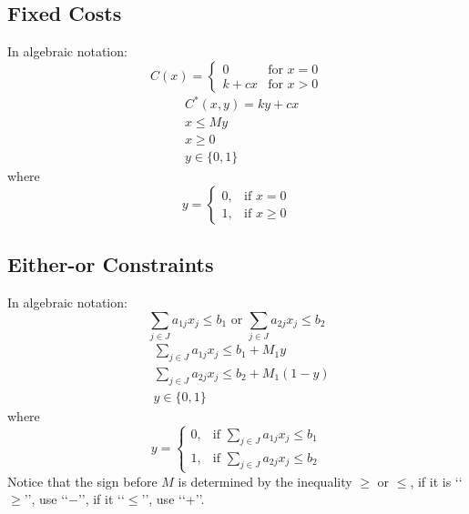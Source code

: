 \documentclass[10pt]{book}
\begin{document}
				\subsection{Fixed Costs}
					 In algebraic notation: 
					\begin{equation}
						C(x) = \begin{cases} 0 & \text{for } x=0 \\ k + cx & \text{for } x > 0 \end{cases} \nonumber
					\end{equation}
					\begin{align}
						& C^*(x, y) = ky+cx\nonumber\\
						& x \le My \nonumber \\
						& x \ge 0 \nonumber\\
						& y \in \{0, 1\} \nonumber
					\end{align}
					where
					\begin{equation}y=\begin{cases}0, & \text{if }x=0 \\ 1, & \text{if }x\ge 0\end{cases}\nonumber \end{equation}
				
				\subsection{Either-or Constraints}
					 In algebraic notation: 
					\begin{equation}
						\sum_{j\in J} a_{1j} x_j \le b_1 \text{ or } \sum_{j\in J} a_{2j} x_j \le b_2 \nonumber
					\end{equation}
					\begin{align}
						& \sum_{j\in J} a_{1j} x_j \le b_1 + M_1y \nonumber \\
						& \sum_{j\in J} a_{2j} x_j \le b_2 + M_1(1-y) \nonumber \\
						& y \in \{0, 1\} \nonumber
					\end{align}
					where
					\begin{equation}y=\begin{cases}0, & \text{if }\sum_{j\in J} a_{1j} x_j \le b_1 \\ 1, & \text{if } \sum_{j\in J} a_{2j} x_j \le b_2\end{cases}\nonumber \end{equation}
					Notice that the sign before $M$ is determined by the inequality $\ge$ or $\le$, if it is \lq\lq{}$\ge$\rq\rq{}, use \lq\lq{}$-$\rq\rq{}, if it \lq\lq{}$\le$\rq\rq{}, use \lq\lq{}+\rq\rq{}.
				
\end{document}
